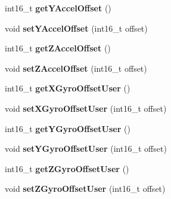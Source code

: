 \begin{DoxyCompactItemize}
\item 
\hypertarget{class_m_p_u6050_a7753d3c3f5d9e341f1ed0712079a0d12}{int16\+\_\+t {\bfseries get\+Y\+Accel\+Offset} ()}\label{class_m_p_u6050_a7753d3c3f5d9e341f1ed0712079a0d12}

\item 
\hypertarget{class_m_p_u6050_a6214fa36c8881f3b02a3e7033678bfb3}{void {\bfseries set\+Y\+Accel\+Offset} (int16\+\_\+t offset)}\label{class_m_p_u6050_a6214fa36c8881f3b02a3e7033678bfb3}

\item 
\hypertarget{class_m_p_u6050_ac9a45355c735a09501b6a58c92fb752c}{int16\+\_\+t {\bfseries get\+Z\+Accel\+Offset} ()}\label{class_m_p_u6050_ac9a45355c735a09501b6a58c92fb752c}

\item 
\hypertarget{class_m_p_u6050_a4d1868b660d695eae912ef73407e21e8}{void {\bfseries set\+Z\+Accel\+Offset} (int16\+\_\+t offset)}\label{class_m_p_u6050_a4d1868b660d695eae912ef73407e21e8}

\item 
\hypertarget{class_m_p_u6050_a609a2c49b1ab075939e2e3d16694a7c1}{int16\+\_\+t {\bfseries get\+X\+Gyro\+Offset\+User} ()}\label{class_m_p_u6050_a609a2c49b1ab075939e2e3d16694a7c1}

\item 
\hypertarget{class_m_p_u6050_a2306a15d278eab385af6ea0fd54c908a}{void {\bfseries set\+X\+Gyro\+Offset\+User} (int16\+\_\+t offset)}\label{class_m_p_u6050_a2306a15d278eab385af6ea0fd54c908a}

\item 
\hypertarget{class_m_p_u6050_ad3ae5fd84d0a125f65dd1e9f81acc636}{int16\+\_\+t {\bfseries get\+Y\+Gyro\+Offset\+User} ()}\label{class_m_p_u6050_ad3ae5fd84d0a125f65dd1e9f81acc636}

\item 
\hypertarget{class_m_p_u6050_a8504811dc64bb338037ac7c098c86913}{void {\bfseries set\+Y\+Gyro\+Offset\+User} (int16\+\_\+t offset)}\label{class_m_p_u6050_a8504811dc64bb338037ac7c098c86913}

\item 
\hypertarget{class_m_p_u6050_a66da03cd0df03c49ad942643482ece9e}{int16\+\_\+t {\bfseries get\+Z\+Gyro\+Offset\+User} ()}\label{class_m_p_u6050_a66da03cd0df03c49ad942643482ece9e}

\item 
\hypertarget{class_m_p_u6050_ada31a0757966357c75189f1cd13f0fee}{void {\bfseries set\+Z\+Gyro\+Offset\+User} (int16\+\_\+t offset)}\label{class_m_p_u6050_ada31a0757966357c75189f1cd13f0fee}


\end{DoxyCompactItemize}
